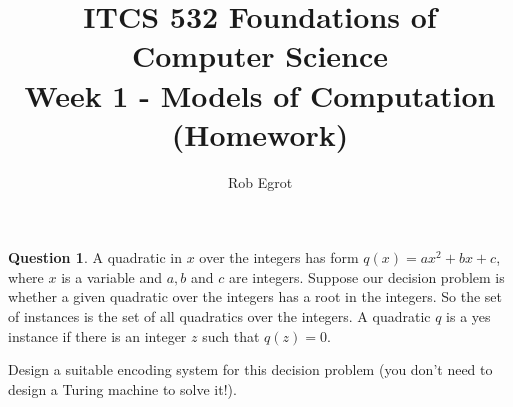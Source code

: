 \documentclass{article}
\title{ITCS 532 Foundations of Computer Science\\
Week 1 - Models of Computation (Homework)}
\author{Rob Egrot}
\date{}
\theoremstyle{definition}
\newtheorem{Q}{Question}
\begin{document}
\maketitle

\begin{Q}
A quadratic in $x$ over the integers has form $q(x)=ax^2+bx+c$, where $x$ is a variable and $a,b$ and $c$ are integers. Suppose our decision problem is whether a given quadratic over the integers has a root in the integers. So the set of instances is the set of all quadratics over the integers. A quadratic $q$ is a yes instance if there is an integer $z$ such that $q(z)=0$.

Design a suitable encoding system for this decision problem (you don't need to design a Turing machine to solve it!).
\end{Q}
\begin{comment}
\textbf{Solution}
Use $\Sigma = \{1,-,*\}$. Store $a$, $b$ and $c$ in unary, separated by $*$, using $-$ to denote negatives. E.g. we express $2x^2 - 3x +1$ as $11*-111*1$.
\end{comment}
\end{document}
